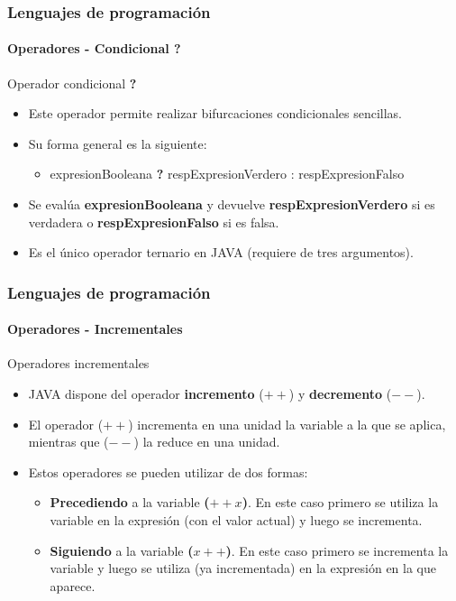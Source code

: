 \documentclass{beamer}
\begin{document}
\begin{frame}
  \frametitle{Lenguajes de programación} 
  \framesubtitle{Operadores - Condicional \textbf{?}}

  \begin{block}{Operador condicional \textbf{?}}
    \begin{itemize}
    \item Este operador permite realizar bifurcaciones condicionales sencillas.
    \item Su forma general es la siguiente:
      \begin{itemize}
      \item expresionBooleana \textbf{?} respExpresionVerdero : respExpresionFalso
      \end{itemize}
    \item Se evalúa \textbf{expresionBooleana} y devuelve \textbf{respExpresionVerdero} si es verdadera o \textbf{respExpresionFalso} si es falsa.
    \item Es el único operador ternario en JAVA (requiere de tres argumentos).
    \end{itemize}
  \end{block}
\end{frame}

\begin{frame}
  \frametitle{Lenguajes de programación} 
  \framesubtitle{Operadores - Incrementales}

  \begin{block}{Operadores incrementales}
    \begin{itemize}
    \item JAVA dispone del operador \textbf{incremento} ($++$) y \textbf{decremento} ($- -$).
    \item El operador ($++$) incrementa en una unidad la variable a la que se aplica, mientras que ($- -$) la reduce en una unidad.
    \item Estos operadores se pueden utilizar de dos formas:
      \begin{itemize}
      \item \textbf{Precediendo}  a la variable \textbf{($++x$)}. En este caso primero se utiliza la variable en la expresión (con el valor actual) y luego se incrementa.
      \item \textbf{Siguiendo} a la variable \textbf{($x++$)}. En este caso primero se incrementa la variable y luego se utiliza (ya incrementada) en la expresión en la que aparece.
      \end{itemize}
    \end{itemize}
  \end{block}
\end{frame}
\end{document}

